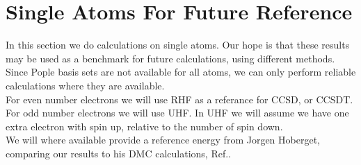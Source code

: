 \documentclass[a4paper,norsk,11pt,twoside]{report}
\begin{document}
\section{Single Atoms For Future Reference}
In this section we do calculations on single atoms. Our hope is that these results may be used as a benchmark for future calculations, using different methods. Since Pople basis sets are not available for all atoms, we can only perform reliable calculations where they are available. \\

For even number electrons we will use RHF as a referance for CCSD, or CCSDT. For odd number electrons we will use UHF. In UHF we will assume we have one extra electron with spin up, relative to the number of spin down. \\

We will where available provide a reference energy from Jorgen Hoberget, comparing our results to his DMC calculations, Ref.\cite{dmc_jorgens_resultater_master}. 
\end{document}
